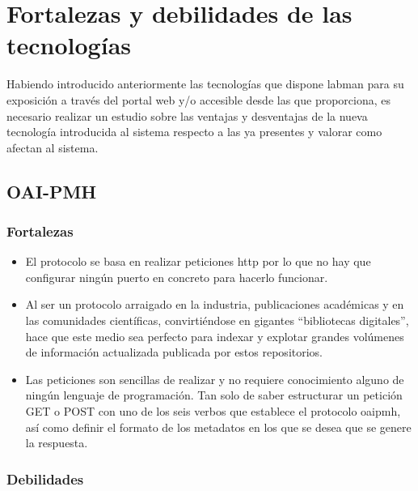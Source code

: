 \section{Fortalezas y debilidades de las tecnologías}

Habiendo introducido anteriormente las tecnologías que dispone \acrshort{labman} para su exposición a través del portal web y/o accesible desde las  que proporciona, es necesario realizar un estudio sobre las ventajas y desventajas de la nueva tecnología introducida al sistema respecto a las ya presentes y valorar como afectan al sistema.

\subsection{OAI-PMH}

\subsubsection{Fortalezas}

\begin{itemize}
	\item El protocolo se basa en realizar peticiones \acrshort{http} por lo que no hay que configurar ningún puerto en concreto para hacerlo funcionar.

	\item Al ser un protocolo arraigado en la industria, publicaciones académicas y en las comunidades científicas, convirtiéndose en gigantes ``bibliotecas digitales'', hace que este medio sea perfecto para indexar y explotar grandes volúmenes de información actualizada publicada por estos repositorios.

	\item Las peticiones son sencillas de realizar y no requiere conocimiento alguno de ningún lenguaje de programación. Tan solo de saber estructurar un petición GET o POST con uno de los seis verbos que establece el protocolo \acrshort{oaipmh}, así como definir el formato de los metadatos en los que se desea que se genere la respuesta.
\end{itemize}

\subsubsection{Debilidades}

